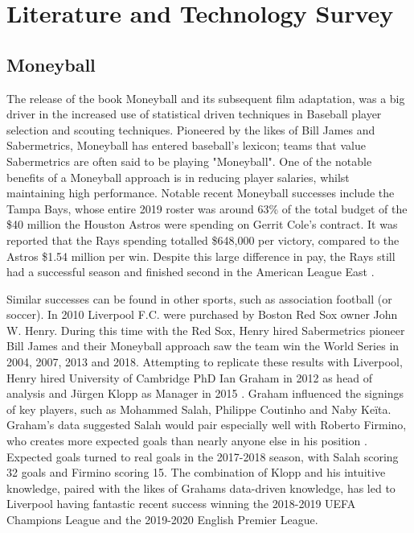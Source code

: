 \documentclass[12pt,a4paper]{report}
\theoremstyle{definition}
\begin{document}
\chapter{Literature and Technology Survey}

\section{Moneyball}

The release of the book Moneyball \citep{Moneyball2004} and its subsequent film adaptation, was a big driver in the increased use of statistical driven techniques in Baseball player selection and scouting techniques. 
Pioneered by the likes of Bill James and Sabermetrics, Moneyball has entered baseball's lexicon; teams that value Sabermetrics are often said to be playing "Moneyball".  
One of the notable benefits of a Moneyball approach is in reducing player salaries, whilst maintaining high performance. 
Notable recent Moneyball successes include the Tampa Bays, whose entire 2019 roster was around 63\% of the total budget of the \$40 million the Houston Astros were spending on Gerrit Cole's contract. 
It was reported that the Rays spending totalled \$648,000 per victory, compared to the Astros \$1.54 million per win.
Despite this large difference in pay, the Rays still had a successful season and finished second in the American League East \citep{Fox2019}.

Similar successes can be found in other sports, such as association football (or soccer). 
In 2010 Liverpool F.C. were purchased by Boston Red Sox owner John W. Henry. 
During this time with the Red Sox, Henry hired Sabermetrics pioneer Bill James and their Moneyball approach saw the team win the World Series in 2004, 2007, 2013 and 2018. 
Attempting to replicate these results with Liverpool, Henry hired University of Cambridge PhD Ian Graham in 2012 as head of analysis and J\"urgen Klopp as Manager in 2015 \citep{Liverpool2022}. 
Graham influenced the signings of key players, such as Mohammed Salah, Philippe Coutinho and Naby Ke\"ita. 
Graham's data suggested Salah would pair especially well with Roberto Firmino, who creates more expected goals than nearly anyone else in his position \citep{Liverpool2019}. 
Expected goals turned to real goals in the 2017-2018 season, with Salah scoring 32 goals and Firmino scoring 15. 
The combination of Klopp and his intuitive knowledge, paired with the likes of Grahams data-driven knowledge, has led to Liverpool having fantastic recent success winning the 2018-2019 UEFA Champions League and the 2019-2020 English Premier League.
\end{document}
